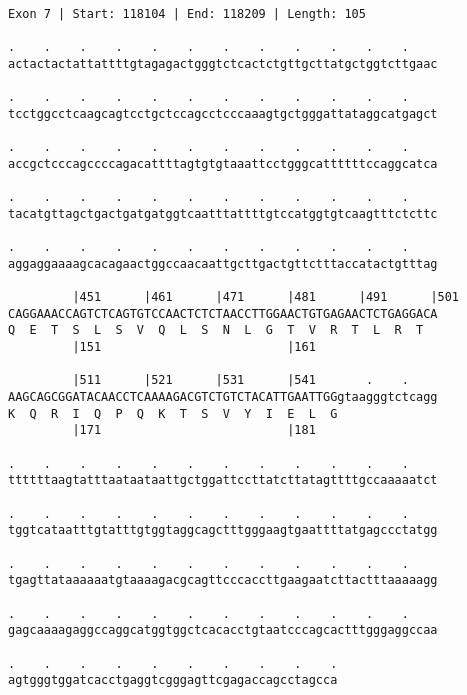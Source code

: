 \documentclass{article}
\begin{document}
\begin{Verbatim}[fontfamily=courier]
Exon 7 | Start: 118104 | End: 118209 | Length: 105

.    .    .    .    .    .    .    .    .    .    .    .    
actactactattattttgtagagactgggtctcactctgttgcttatgctggtcttgaac

.    .    .    .    .    .    .    .    .    .    .    .    
tcctggcctcaagcagtcctgctccagcctcccaaagtgctgggattataggcatgagct

.    .    .    .    .    .    .    .    .    .    .    .    
accgctcccagccccagacattttagtgtgtaaattcctgggcattttttccaggcatca

.    .    .    .    .    .    .    .    .    .    .    .    
tacatgttagctgactgatgatggtcaatttattttgtccatggtgtcaagtttctcttc

.    .    .    .    .    .    .    .    .    .    .    .    
aggaggaaaagcacagaactggccaacaattgcttgactgttctttaccatactgtttag

         |451      |461      |471      |481      |491      |501
CAGGAAACCAGTCTCAGTGTCCAACTCTCTAACCTTGGAACTGTGAGAACTCTGAGGACA
Q  E  T  S  L  S  V  Q  L  S  N  L  G  T  V  R  T  L  R  T  
         |151                          |161                 

         |511      |521      |531      |541       .    .    
AAGCAGCGGATACAACCTCAAAAGACGTCTGTCTACATTGAATTGGgtaagggtctcagg
K  Q  R  I  Q  P  Q  K  T  S  V  Y  I  E  L  G              
         |171                          |181                 

.    .    .    .    .    .    .    .    .    .    .    .    
ttttttaagtatttaataataattgctggattccttatcttatagttttgccaaaaatct

.    .    .    .    .    .    .    .    .    .    .    .    
tggtcataatttgtatttgtggtaggcagctttgggaagtgaattttatgagccctatgg

.    .    .    .    .    .    .    .    .    .    .    .    
tgagttataaaaaatgtaaaagacgcagttcccaccttgaagaatcttactttaaaaagg

.    .    .    .    .    .    .    .    .    .    .    .    
gagcaaaagaggccaggcatggtggctcacacctgtaatcccagcactttgggaggccaa

.    .    .    .    .    .    .    .    .    .
agtgggtggatcacctgaggtcgggagttcgagaccagcctagcca
\end{Verbatim}
\newpage
\end{document}

